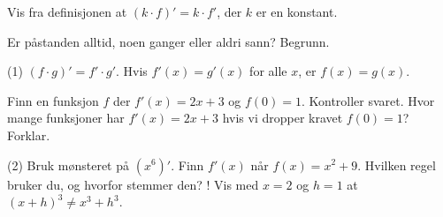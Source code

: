 
Vis fra definisjonen at $(k \cdot f)' = k \cdot f'$, der $k$ er en konstant.

Er påstanden alltid, noen ganger eller aldri sann? Begrunn.
\begin{tasks}(1)
  \task $(f \cdot g)' = f' \cdot g'$.
  \task Hvis $f'(x) = g'(x)$ for alle $x$, er $f(x) = g(x)$.
\end{tasks}

Finn en funksjon $f$ der $f'(x) = 2x + 3$ og $f(0) = 1$. Kontroller svaret. Hvor mange funksjoner har $f'(x) = 2x + 3$ hvis vi dropper kravet $f(0) = 1$? Forklar.

\begin{sjekk}
\begin{tasks}(2)
  \task Bruk mønsteret på $(x^6)'$.
  \task Finn $f'(x)$ når $f(x) = x^2 + 9$. Hvilken regel bruker du, og hvorfor stemmer den?
  \task! Vis med $x = 2$ og $h = 1$ at $(x + h)^3 \neq x^3 + h^3$.
\end{tasks}
\end{sjekk}
